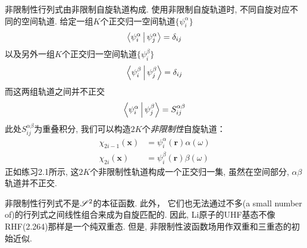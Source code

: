 非限制性行列式由非限制自旋轨道构成. 使用非限制自旋轨道时, 不同自旋对应不同的空间轨道. 给定一组$K$个正交归一空间轨道$\{\psi_i^\alpha\}$
\begin{align}
\Braket{\psi_i^\alpha|\psi_j^\alpha}=\delta_{ij}
\end{align}
以及另外一组$K$个正交归一空间轨道$\{\psi_i^\beta\}$
\begin{align}
\Braket{\psi_i^\beta|\psi_j^\beta}=\delta_{ij}
\end{align}
而这两组轨道之间并不正交
\begin{align}
\Braket{\psi_i^\alpha|\psi_j^\beta}=S_{ij}^{\alpha\beta}
\end{align}
此处$S_{ij}^{\alpha\beta}$为重叠积分, 我们可以构造$2K$个\emph{非限制性}自旋轨道：
\begin{equation}
\begin{split}
\chi_{2i-1}(\mathbf{x}) &= \psi_i^\alpha(\mathbf{r})\alpha(\omega)\\
\chi_{2i}(\mathbf{x})   &= \psi_i^\beta(\mathbf{r})\beta(\omega) 
\end{split}
\end{equation}
正如练习2.1所示, 这$2K$个非限制性轨道构成一个正交归一集, 虽然在空间部分, $\alpha$$\beta$轨道并不正交.

非限制性行列式不是$\mathscr{S}^2$的本征函数. 此外， 它们也无法通过不多(a small number of)的行列式之间线性组合来成为自旋匹配的. 因此, Li原子的UHF基态不像RHF(2.264)那样是一个纯双重态. 但是, 非限制性波函数场用作双重和三重态的初始近似. 

